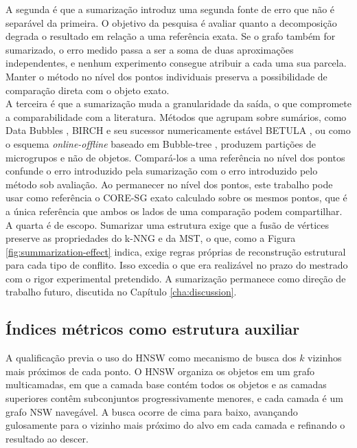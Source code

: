 A segunda é que a sumarização introduz uma segunda fonte de erro que não é separável da primeira. O objetivo da pesquisa é avaliar quanto a decomposição degrada o resultado em relação a uma referência exata. Se o grafo também for sumarizado, o erro medido passa a ser a soma de duas aproximações independentes, e nenhum experimento consegue atribuir a cada uma sua parcela. Manter o método no nível dos pontos individuais preserva a possibilidade de comparação direta com o objeto exato.\\

A terceira é que a sumarização muda a granularidade da saída, o que compromete a comparabilidade com a literatura. Métodos que agrupam sobre sumários, como Data Bubbles \cite{databubbles}, BIRCH \cite{birch} e seu sucessor numericamente estável BETULA \cite{betula}, ou como o esquema \textit{online-offline} baseado em Bubble-tree \cite{bubble-tree}, produzem partições de microgrupos e não de objetos. Compará-los a uma referência no nível dos pontos confunde o erro introduzido pela sumarização com o erro introduzido pelo método sob avaliação. Ao permanecer no nível dos pontos, este trabalho pode usar como referência o \ac{CORE-SG} exato calculado sobre os mesmos pontos, que é a única referência que ambos os lados de uma comparação podem compartilhar.\\

A quarta é de escopo. Sumarizar uma estrutura exige que a fusão de vértices preserve as propriedades do \ac{k-NNG} e da \ac{MST}, o que, como a Figura \ref{fig:summarization-effect} indica, exige regras próprias de reconstrução estrutural para cada tipo de conflito. Isso excedia o que era realizável no prazo do mestrado com o rigor experimental pretendido. A sumarização permanece como direção de trabalho futuro, discutida no Capítulo \ref{cha:discussion}.\\

\subsection{Índices métricos como estrutura auxiliar\label{sec:discarded-index}}

A qualificação previa o uso do \ac{HNSW} \cite{hnsw} como mecanismo de busca dos $k$ vizinhos mais próximos de cada ponto. O \ac{HNSW} organiza os objetos em um grafo multicamadas, em que a camada base contém todos os objetos e as camadas superiores contêm subconjuntos progressivamente menores, e cada camada é um grafo \ac{NSW} navegável. A busca ocorre de cima para baixo, avançando gulosamente para o vizinho mais próximo do alvo em cada camada e refinando o resultado ao descer.\\


